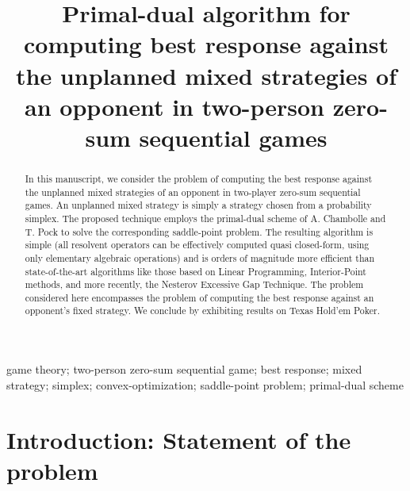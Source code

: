 \documentclass[a4paper,10pt,journal]{IEEEtran}
\begin{document}
\title{Primal-dual algorithm for computing best response against the unplanned mixed strategies of an opponent in two-person zero-sum sequential games}


\author{}


\maketitle

\begin{abstract}
% 

In this manuscript, we consider the problem of computing the best response against the  unplanned mixed strategies of an opponent
in two-player zero-sum sequential games. An unplanned mixed strategy is simply a strategy chosen from a probability simplex.
The proposed technique employs the primal-dual scheme of A. Chambolle and T. Pock to solve the corresponding saddle-point problem.
The resulting algorithm is simple (all resolvent operators can be effectively computed quasi closed-form, using only elementary algebraic operations)
 and is orders of magnitude more efficient than state-of-the-art algorithms like those based on Linear Programming, Interior-Point methods,
and more recently, the Nesterov Excessive Gap Technique. The problem considered here encompasses the problem of computing the best response against an opponent's fixed strategy.
We conclude by exhibiting results on Texas Hold'em Poker.
\end{abstract}


\begin{IEEEkeywords}
  game theory; two-person zero-sum sequential game; best response; mixed strategy; simplex; convex-optimization; saddle-point problem; primal-dual scheme
\end{IEEEkeywords}

\section{Introduction: Statement of the problem}
\label{sec:intro}
\end{document}
